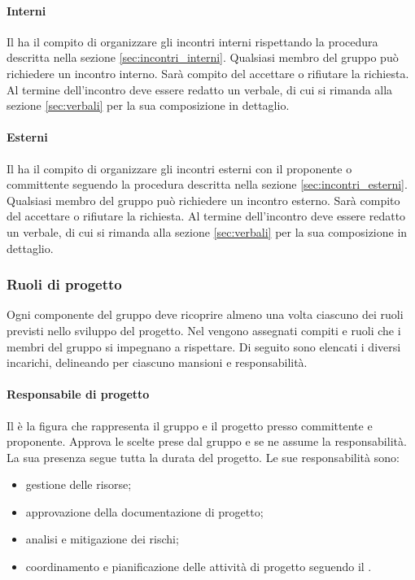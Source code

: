             \paragraph{Interni}
            Il \responsabilediprogetto{} ha il compito di organizzare gli incontri interni rispettando la procedura descritta nella sezione \ref{sec:incontri_interni}{}.
	        Qualsiasi membro del gruppo può richiedere un incontro interno. Sarà compito del \responsabilediprogetto{} accettare o rifiutare la richiesta.
        	Al termine dell'incontro deve essere redatto un verbale, di cui si rimanda alla sezione \ref{sec:verbali} per la sua composizione in dettaglio.
            \paragraph{Esterni}
            Il \responsabilediprogetto{} ha il compito di organizzare gli incontri esterni con il proponente o committente seguendo la procedura descritta nella sezione \ref{sec:incontri_esterni}.
            Qualsiasi membro del gruppo può richiedere un incontro esterno. Sarà compito del \responsabilediprogetto{} accettare o rifiutare la richiesta.
            Al termine dell'incontro deve essere redatto un verbale, di cui si rimanda alla sezione \ref{sec:verbali} per la sua composizione in dettaglio.
        \subsubsection{Ruoli di progetto}
        	Ogni componente del gruppo deve ricoprire almeno una volta ciascuno dei ruoli previsti nello sviluppo del progetto. Nel \pdp{} vengono assegnati  compiti e ruoli che i membri del gruppo si impegnano a rispettare. Di seguito sono elencati i diversi incarichi, delineando per ciascuno mansioni e responsabilità.
			\paragraph{Responsabile di progetto}
			Il \responsabilediprogetto{} è la figura che rappresenta il gruppo e il progetto presso committente e proponente. Approva le scelte prese dal gruppo e se ne assume la responsabilità. La sua presenza segue tutta la durata del progetto.
			Le sue responsabilità sono:
			\begin{itemize}
				\item gestione delle risorse;
				\item approvazione della documentazione di progetto;
				\item analisi e mitigazione dei rischi;
				\item coordinamento e pianificazione delle attività di progetto seguendo il \pdp{}.
			\end{itemize}
